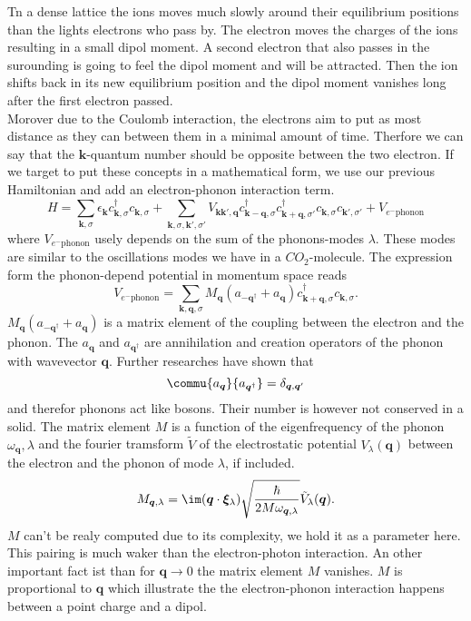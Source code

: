 \documentclass[../main.tex]{subfile}
\begin{document}
Tn a dense lattice the ions moves much slowly around their equilibrium positions than the lights electrons who pass by. The electron moves the charges of the ions resulting
in a small dipol moment. A second electron that also passes in the surounding is going to feel the dipol moment and will be 
attracted. Then the ion shifts back in its new equilibrium position and the dipol moment vanishes long after the first electron passed.\\

Morover due to the Coulomb interaction, the electrons aim to put as most distance as they can between them in a minimal amount of time. Therfore
we can say that the $\bm{k}$-quantum number should be opposite between the two electron. If we target to put these concepts in a mathematical form, we use
our previous Hamiltonian and add an electron-phonon interaction term.
\[
    H = \sum_{\bm{k},\sigma} \epsilon_{\bm{k}} c_{\bm{k},\sigma}^{\dagger}c_{\bm{k},\sigma} + \sum_{\bm{k},\sigma,\bm{k}',\sigma'}
        V_{\bm{k}\bm{k}', \bm{q}} c_{\bm{k}-\bm{q},\sigma}^{\dagger}c_{\bm{k}+\bm{q},\sigma'}^{\dagger}c_{\bm{k},\sigma}c_{\bm{k}',\sigma'} + V_{e^-\text{phonon}}
\]
where $V_{e^-\text{phonon}}$ usely depends on the sum of the phonons-modes $\lambda$. These modes are similar to the oscillations modes we have in a $CO_2$-molecule.
The expression form the phonon-depend potential in momentum space reads 
\begin{equation} \label{eq:Pot_phonon_interaction}
    V_{e^-\text{phonon}} = \sum_{\bm{k},\bm{q},\sigma} M_{\bm{q}}\left(a_{-\bm{q}^{\dagger}} + a_{\bm{q}}\right) c_{\bm{k}+\bm{q},\sigma}^{\dagger}c_{\bm{k},\sigma}.
\end{equation}
$M_{\bm{q}}\left(a_{-\bm{q}^{\dagger}} + a_{\bm{q}}\right) $ is a matrix element of the coupling between the electron and the phonon. 
The $a_{\bm{q}}$ and $a_{\bm{q}^{\dagger}}$ are annihilation and creation operators of the phonon with wavevector $\bm{q}$. Further researches have shown that 
\[
    \commu{a_{\bm{q}}}{a_{\bm{q}^{\dagger}}} = \delta_{\bm{q},\bm{q}'}
\] 
and therefor phonons act like bosons. Their number is however not conserved in a solid. The matrix element $M$ is a function of the eigenfrequency 
 of the phonon $\omega_{\bm{q}},\lambda$ and the fourier tramsform $\tilde{V}$ of the electrostatic potential $V_{\lambda}(\bm{q})$ between the electron
and the phonon of mode $\lambda$, if included.   
\[
    M_{\bm{q},\lambda} = \im (\bm{q}\cdot \bm{\xi}_{\lambda}) \sqrt{\frac{\hbar}{2M\omega_{\bm{q},\lambda}}} \tilde{V}_{\lambda}(\bm{q}).
\]
$M$ can't be realy computed due to its complexity, we hold it as a parameter here. This pairing is much waker than the electron-photon interaction. 
An other important fact ist than for $\bm{q}\rightarrow 0$ the matrix element $M$ vanishes. $M$ is proportional to $\bm{q}$ which illustrate the the electron-phonon interaction
happens between a point charge and a dipol.\\
\end{document}
